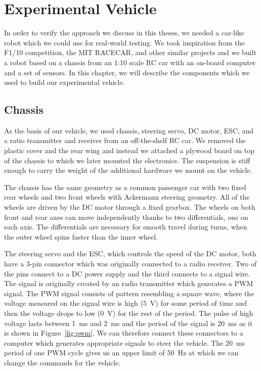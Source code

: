 \chapter{Experimental Vehicle}

In order to verify the approach we discuss in this theses, we needed a car-like robot which we could use for real-world testing. We took inspiration from the F1/10 competition, the MIT RACECAR, and other similar projects and we built a robot based on a chassis from an 1:10 scale \gls{RC} car with an on-board computer and a set of sensors. In this chapter, we will describe the components which we used to build our experimental vehicle.

\section{Chassis}

As the basis of our vehicle, we used chassis, steering servo, \gls{DC} motor, \gls{ESC}, and a ratio transmitter and receiver from an off-the-shelf \gls*{RC} car. We removed the plastic cover and the rear wing and instead we attached a plywood board on top of the chassis to which we later mounted the electronics. The suspension is stiff enough to carry the weight of the additional hardware we mount on the vehicle.

The chassis has the same geometry as a common passenger car with two fixed rear wheels and two front wheels with Ackermann steering geometry. All of the wheels are driven by the \gls*{DC} motor through a fixed gearbox. The wheels on both front and rear axes can move independently thanks to two differentials, one on each axis. The differentials are necessary for smooth travel during turns, when the outer wheel spins faster than the inner wheel.

The steering servo and the \gls*{ESC}, which controls the speed of the \gls*{DC} motor, both have a 3-pin connector which was originally connected to a radio receiver. Two of the pins connect to a \gls*{DC} power supply and the third connects to a signal wire. The signal is originally created by an radio transmitter which generates a \gls{PWM} signal. The \gls*{PWM} signal consists of pattern resembling a square wave, where the voltage measured on the signal wire is high (\SI{5}{\volt}) for some period of time and then the voltage drops to low (\SI{0}{\volt}) for the rest of the period. The pulse of high voltage lasts between \SI{1}{\milli\second} and \SI{2}{\milli\second} and the period of the signal is \SI{20}{\milli\second} as it is shown in Figure~\ref{fig:pwm}. We can therefore connect these connectors to a computer which generates appropriate signals to steer the vehicle. The \SI{20}{\milli\second} period of one \gls*{PWM} cycle gives us an upper limit of \SI{50}{\hertz} at which we can change the commands for the vehicle.


